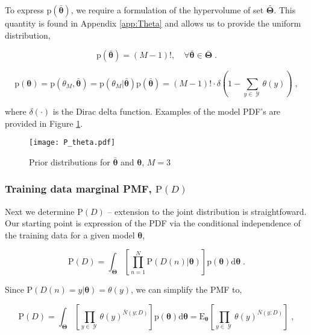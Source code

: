 \documentclass[12pt]{report}
\DeclareMathOperator{\Ycal}{\mathcal{Y}}
\begin{document}
To express $\text{p}\left(\bar{\bm{\theta}}\right)$, we require a formulation of the hypervolume of set $\bar{\bm{\Theta}}$. This quantity is found in Appendix \ref{app:Theta} and allows us to provide the uniform distribution,

\begin{equation}
\text{p}\left(\bar{\bm{\theta}}\right)= (M-1)!,  \quad \forall \bar{\bm{\theta}} \in \bar{\bm{\Theta}} \;.
\end{equation}

\begin{equation}
\text{p}(\bm{\theta}) = \text{p}(\theta_M,\bar{\bm{\theta}}) = \text{p}\left( \theta_M | \bar{\bm{\theta}} \right) \text{p}\left(\bar{\bm{\theta}}\right)
= (M-1)! \cdot \delta\left( 1 - \sum_{y \in \Ycal} \theta(y) \right) \;,
\end{equation}

where $\delta(\cdot)$ is the Dirac delta function. Examples of the model PDF's are provided in Figure \ref{fig:P_theta}.

\begin{figure}
\centering
\texttt{[image: P\_theta.pdf]}
\caption{Prior distributions for $\bar{\bm{\theta}}$ and $\bm{\theta}$, $M=3$}
\label{fig:P_theta}
\end{figure}


\subsubsection{Training data marginal PMF, $\text{P}(D)$}

Next we determine $\text{P}(D)$ -- extension to the joint distribution is straightfoward. Our starting point is expression of the PDF via the conditional independence of the training data for a given model $\bm{\theta}$,

\begin{equation}
\text{P}(D) = \int_{\bm{\Theta}} \left[ \prod_{n=1}^N \text{P}(D(n) | \bm{\theta}) \right] \text{p}(\bm{\theta}) \mathrm{d}\bm{\theta} \;.
\end{equation}

Since $\text{P}(D(n) = y | \bm{\theta}) = \theta(y)$, we can simplify the PMF to,

\begin{equation} \label{P_D_int2}
\text{P}(D) = \int_{\bm{\Theta}} \left[ \prod_{y \in \Ycal} \theta(y)^{\bar{N}(y;D)} \right] \text{p}(\bm{\theta}) \mathrm{d}\bm{\theta} 
= \text{E}_{\bm{\theta}} \left[ \prod_{y \in \Ycal} \theta(y)^{\bar{N}(y;D)} \right] \;,
\end{equation}
\end{document}

